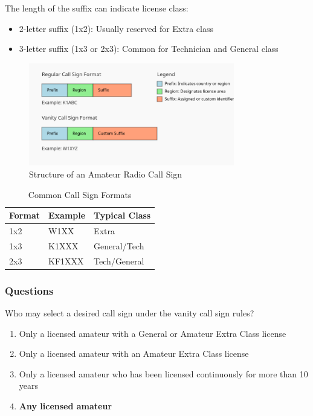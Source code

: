 The length of the suffix can indicate license class:
\begin{itemize}
    \item 2-letter suffix (1x2): Usually reserved for Extra class
    \item 3-letter suffix (1x3 or 2x3): Common for Technician and General class
\end{itemize}

\begin{figure}[h]
    \centering
    \includegraphics[width=0.8\textwidth]{tech/images/call-sign-structure.png}
    \caption{Structure of an Amateur Radio Call Sign}
    \label{fig:call-sign-structure}
\end{figure}

\begin{table}[h]
    \centering
    \begin{tabular}{|l|l|l|}
        \hline
        \textbf{Format} & \textbf{Example} & \textbf{Typical Class} \\
        \hline
        1x2 & W1XX & Extra \\
        1x3 & K1XXX & General/Tech \\
        2x3 & KF1XXX & Tech/General \\
        \hline
    \end{tabular}
    \caption{Common Call Sign Formats}
    \label{tab:call-sign-formats}
\end{table}

\subsubsection*{Questions}

\begin{tcolorbox}[colback=gray!10!white,colframe=black!75!black,title={T1C02}]
    Who may select a desired call sign under the vanity call sign rules?
    \begin{enumerate}[label=\Alph*),noitemsep]
        \item Only a licensed amateur with a General or Amateur Extra Class license
        \item Only a licensed amateur with an Amateur Extra Class license
        \item Only a licensed amateur who has been licensed continuously for more than 10 years
        \item \textbf{Any licensed amateur}
    \end{enumerate}
\end{tcolorbox}

